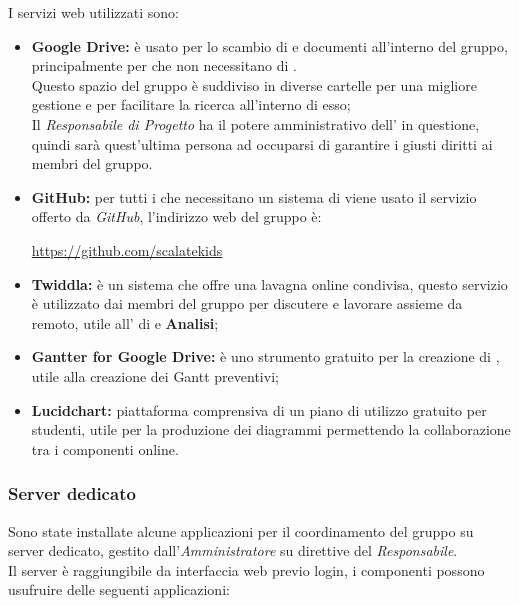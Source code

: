 \documentclass{scalatekids-article}
\begin{document}
\label{sec:ServiziWeb}
I servizi web utilizzati sono:
\begin{itemize}
    \item\textbf{Google Drive:} è usato per lo scambio di  e documenti all'interno del gruppo, principalmente per  che non necessitano di .\\
        Questo spazio del gruppo è suddiviso in diverse cartelle per una migliore gestione e per facilitare la ricerca all'interno di esso;\\
        Il \textit{Responsabile di Progetto} ha il potere amministrativo dell' in questione, quindi sarà quest'ultima persona ad occuparsi di garantire i giusti diritti ai membri del gruppo.
    \item\textbf{GitHub:} per tutti i  che necessitano un sistema di  viene usato il servizio offerto da \textit{GitHub}, l'indirizzo web del gruppo è:\\
        \begin{center}
            \url{https://github.com/scalatekids}
        \end{center}
    \item\textbf{Twiddla:} è un sistema che offre una lavagna online condivisa, questo servizio è utilizzato dai membri del gruppo per discutere e lavorare assieme da remoto, utile all' di  e \textbf{Analisi};
    \item\textbf{Gantter for Google Drive:} è uno strumento gratuito per la creazione di , utile alla creazione dei Gantt preventivi;
    \item\textbf{Lucidchart:} piattaforma comprensiva di un piano di utilizzo
        gratuito per studenti, utile per la produzione dei diagrammi
         permettendo la collaborazione tra i componenti online.
\end{itemize}

\subsubsection{Server dedicato}

\label{sec:server}
Sono state installate alcune applicazioni per il coordinamento del gruppo su
server dedicato, gestito dall'\textit{Amministratore} su direttive del
\textit{Responsabile}.\\ Il server è raggiungibile da interfaccia web previo
login, i componenti possono usufruire delle seguenti applicazioni:
\end{document}

